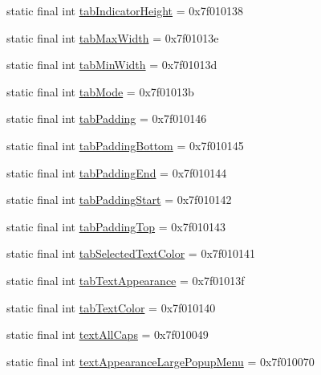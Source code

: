 \begin{CompactItemize}
\item 
static final int \hyperlink{classandroid_1_1support_1_1v7_1_1appcompat_1_1_r_1_1attr_dd1eb1d471ed824e2a2457d2b651437d}{tabIndicatorHeight} = 0x7f010138
\item 
static final int \hyperlink{classandroid_1_1support_1_1v7_1_1appcompat_1_1_r_1_1attr_bed8f2120136daed0d3ca4c6ca6f8fee}{tabMaxWidth} = 0x7f01013e
\item 
static final int \hyperlink{classandroid_1_1support_1_1v7_1_1appcompat_1_1_r_1_1attr_245bd7de5c3e16903d073065aa59ec58}{tabMinWidth} = 0x7f01013d
\item 
static final int \hyperlink{classandroid_1_1support_1_1v7_1_1appcompat_1_1_r_1_1attr_e9a707b6d6def3779b34e98677ee43b9}{tabMode} = 0x7f01013b
\item 
static final int \hyperlink{classandroid_1_1support_1_1v7_1_1appcompat_1_1_r_1_1attr_556aaae13b0f53a2318a4aee478c1bf2}{tabPadding} = 0x7f010146
\item 
static final int \hyperlink{classandroid_1_1support_1_1v7_1_1appcompat_1_1_r_1_1attr_9048f153b6e18a89ee8db966376a60d3}{tabPaddingBottom} = 0x7f010145
\item 
static final int \hyperlink{classandroid_1_1support_1_1v7_1_1appcompat_1_1_r_1_1attr_b08d3c84ee4c7a636b0dc662be161f46}{tabPaddingEnd} = 0x7f010144
\item 
static final int \hyperlink{classandroid_1_1support_1_1v7_1_1appcompat_1_1_r_1_1attr_64f2850e3b1f3f883ecb4d24cc98ead0}{tabPaddingStart} = 0x7f010142
\item 
static final int \hyperlink{classandroid_1_1support_1_1v7_1_1appcompat_1_1_r_1_1attr_f02b828994c5f6e72dc58ec0d51cfc30}{tabPaddingTop} = 0x7f010143
\item 
static final int \hyperlink{classandroid_1_1support_1_1v7_1_1appcompat_1_1_r_1_1attr_59183241c2e3a42e3b3fbe575acb4157}{tabSelectedTextColor} = 0x7f010141
\item 
static final int \hyperlink{classandroid_1_1support_1_1v7_1_1appcompat_1_1_r_1_1attr_3793623a854fccd51fea356e47904495}{tabTextAppearance} = 0x7f01013f
\item 
static final int \hyperlink{classandroid_1_1support_1_1v7_1_1appcompat_1_1_r_1_1attr_5be6e0937a6b1f1ace4e24d0567e538a}{tabTextColor} = 0x7f010140
\item 
static final int \hyperlink{classandroid_1_1support_1_1v7_1_1appcompat_1_1_r_1_1attr_ffa6d158022ffbf0f333c71bd57ce180}{textAllCaps} = 0x7f010049
\item 
static final int \hyperlink{classandroid_1_1support_1_1v7_1_1appcompat_1_1_r_1_1attr_1082980434da9dbead38ea762169cd4c}{textAppearanceLargePopupMenu} = 0x7f010070

\end{CompactItemize}

